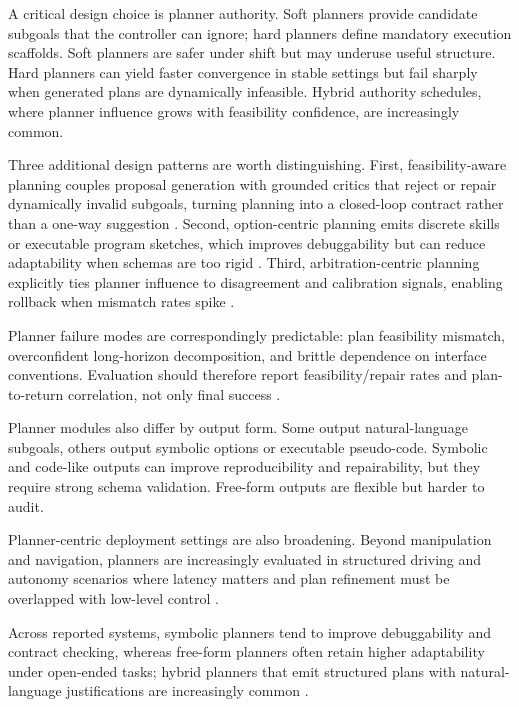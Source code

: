 ﻿\documentclass[conference]{IEEEtran}
\begin{document}
A critical design choice is planner authority. Soft planners provide candidate subgoals that the controller can ignore; hard planners define mandatory execution scaffolds. Soft planners are safer under shift but may underuse useful structure. Hard planners can yield faster convergence in stable settings but fail sharply when generated plans are dynamically infeasible. Hybrid authority schedules, where planner influence grows with feasibility confidence, are increasingly common.

Three additional design patterns are worth distinguishing. First, feasibility-aware planning couples proposal generation with grounded critics that reject or repair dynamically invalid subgoals, turning planning into a closed-loop contract rather than a one-way suggestion \cite{arxiv_p_2204_01691,arxiv_p_2405_01534,arxiv_p_2512_12716,arxiv_p_2602_16165}. Second, option-centric planning emits discrete skills or executable program sketches, which improves debuggability but can reduce adaptability when schemas are too rigid \cite{doi_p_10_1109_icra48891_2023_10160591,arxiv_p_2601_14140,arxiv_p_2510_13229}. Third, arbitration-centric planning explicitly ties planner influence to disagreement and calibration signals, enabling rollback when mismatch rates spike \cite{arxiv_p_2602_06493,arxiv_p_2602_12579,arxiv_p_2508_03680}.

Planner failure modes are correspondingly predictable: plan feasibility mismatch, overconfident long-horizon decomposition, and brittle dependence on interface conventions. Evaluation should therefore report feasibility/repair rates and plan-to-return correlation, not only final success \cite{arxiv_p_2512_12716,arxiv_p_2602_16165,arxiv_p_2602_07848}.

Planner modules also differ by output form. Some output natural-language subgoals, others output symbolic options or executable pseudo-code. Symbolic and code-like outputs can improve reproducibility and repairability, but they require strong schema validation. Free-form outputs are flexible but harder to audit.

Planner-centric deployment settings are also broadening. Beyond manipulation and navigation, planners are increasingly evaluated in structured driving and autonomy scenarios where latency matters and plan refinement must be overlapped with low-level control \cite{arxiv_p_2406_14556}.

Across reported systems, symbolic planners tend to improve debuggability and contract checking, whereas free-form planners often retain higher adaptability under open-ended tasks; hybrid planners that emit structured plans with natural-language justifications are increasingly common \cite{doi_p_10_1109_icra48891_2023_10160591,arxiv_p_2510_13229,arxiv_p_2510_14967,arxiv_p_2601_14140}.
\end{document}
